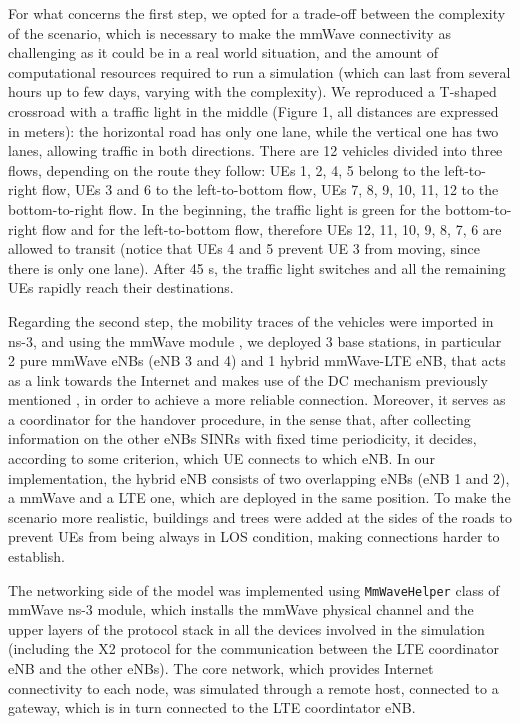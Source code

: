 \documentclass[conference,10pt]{IEEEtran}
\begin{document}
For what concerns the first step, we opted for a trade-off between the complexity of the scenario, which is necessary to make the mmWave connectivity as challenging as it could be in a real world situation, and the amount of computational resources required to run a simulation (which can last from several hours up to few days, varying with the complexity). We reproduced a T-shaped crossroad with a traffic light in the middle (Figure 1, all distances are expressed in meters): the horizontal road has only one lane, while the vertical one has two lanes, allowing traffic in both directions. There are 12 vehicles divided into three flows, depending on the route they follow: UEs 1, 2, 4, 5 belong to the left-to-right flow, UEs 3 and 6 to the left-to-bottom flow, UEs 7, 8, 9, 10, 11, 12 to the bottom-to-right flow.
In the beginning, the traffic light is green for the bottom-to-right flow and for the left-to-bottom flow, therefore UEs 12, 11, 10, 9, 8, 7, 6 are allowed to transit (notice that UEs 4 and 5 prevent UE 3 from moving, since there is only one lane). After 45 s, the traffic light switches and all the remaining UEs rapidly reach their destinations.

Regarding the second step, the mobility traces of the vehicles were imported in ns-3, and using the mmWave module \cite{mmwmodule}, we deployed 3 base stations, in particular 2 pure mmWave eNBs (eNB 3 and 4) and 1 hybrid mmWave-LTE eNB, that acts as a link towards the Internet and makes use of the DC mechanism previously mentioned \cite{imphand}, in order to achieve a more reliable connection. Moreover, it serves as a coordinator for the handover procedure, in the sense that, after collecting information on the other eNBs SINRs with fixed time periodicity, it decides, according to some criterion, which UE connects to which eNB. In our implementation, the hybrid eNB consists of two overlapping eNBs (eNB 1 and 2), a mmWave and a LTE one, which are deployed in the same position. To make the scenario more realistic, buildings and trees were added at the sides of the roads to prevent UEs from being always in LOS condition, making connections harder to establish.

The networking side of the model was implemented using \texttt{MmWaveHelper} class of mmWave ns-3 module, which installs the mmWave physical channel and the upper layers of the protocol stack in all the devices involved in the simulation (including the X2 protocol for the communication between the LTE coordinator eNB and the other eNBs). The core network, which provides Internet connectivity to each node, was simulated through a remote host, connected to a gateway, which is in turn connected to the LTE coordintator eNB.
\end{document}
